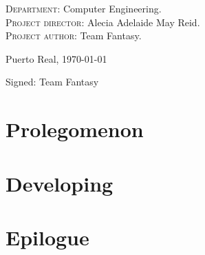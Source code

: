 \documentclass{book}
\begin{document}
{\begin{flushleft}
	\textsc{Department}: \nohyphens{Computer Engineering.} \\
	\textsc{Project director}: \nohyphens{Alecia Adelaide May Reid.} \\
	\textsc{Project author}: \nohyphens{Team Fantasy}. \\
\end{flushleft}

\bigskip
\bigskip
\bigskip

\begin{flushright}
	\large
	Puerto Real, \today
	
	\bigskip    
	\bigskip
	\bigskip
	\bigskip
	\bigskip
	\bigskip
	\bigskip
	\bigskip
	Signed: Team Fantasy
	
\end{flushright}

}

\newpage




	\tableofcontents
	\newpage
	
	\part{Prolegomenon}
	
	
	
	\part{Developing}
	
	
	
	
	
	\part{Epilogue}
	
	
	
	
	
	
\end{document}
